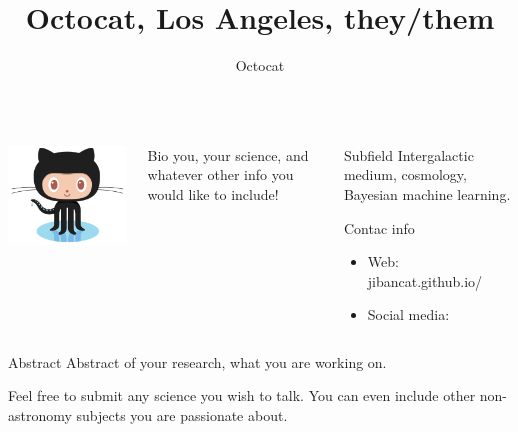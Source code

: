 \documentclass{beamer}
\author[Octocat@ucla.edu]{Octocat}
\title{Octocat, Los Angeles, they/them}
\institute{UC Los Angeles}
\begin{document}
\begin{frame}[fragile]
  \begin{columns}[T]

    \begin{column}{.33\textwidth}
      
      \begin{block}{}
        \begin{center}
          \includegraphics[width=8cm]{images/Octocat.png}
        \end{center}
      \end{block}
    \end{column}

    \begin{column}{.40\textwidth}

      \begin{block}{Bio}
        you, your science, and whatever other info you would like to include!
      \end{block}
    \end{column}

    \begin{column}{.20\textwidth}
      \begin{block}{Subfield}
        Intergalactic medium, cosmology, Bayesian machine learning.
      \end{block}
      \begin{block}{Contac info}    
        \begin{itemize}
          \item Web: jibancat.github.io/
          \item Social media:
        \end{itemize}
      \end{block}
  
  \end{column}

  \end{columns}

  \begin{block}{Abstract}
    Abstract of your research, what you are working on.

    Feel free to submit any science you wish to talk. You can even include other non-astronomy subjects you are passionate about.
  \end{block}


\end{frame}
\end{document}
